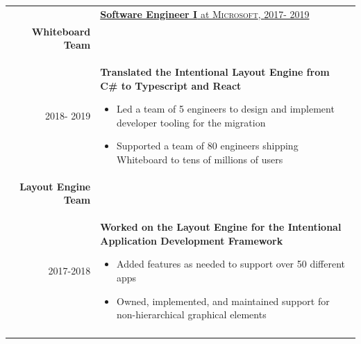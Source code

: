 \documentclass[letterpaper,10pt]{article} %
\newcommand{\work}[4]{\textsc{#1} & \underline{\textbf{#2} at \textsc{#3}}\\ 
\\
& #4\\
\multicolumn{2}{c}{} \\}
\newcommand{\workTwo}[9]{& \underline{\textbf{#2} at \textsc{#3},  \textsc{#1}}\\
\textbf{#4} \\
\textsc{#5} & #6\\
\textbf{#7} \\
\textsc{#8} & #9 \\
\multicolumn{2}{c}{} \\}
\begin{document}
\begin{tabular}{r|p{14.5cm}}
{%


}


\workTwo{2017- 2019}{Software Engineer I}{Microsoft}
{ Whiteboard Team }{2018- 2019}{

\textbf{Translated the Intentional Layout Engine from C\# to Typescript and React}
\begin{itemize}
	\item{Led a team of 5 engineers to design and implement developer tooling for the migration}
	\item{Supported a team of 80 engineers shipping Whiteboard to tens of millions of users}
\end{itemize} 

}
{ Layout Engine Team}{2017-2018}{
\textbf{Worked on the Layout Engine for the Intentional Application Development Framework}
\begin{itemize}
	\item{Added features as needed to support over 50 different apps}
	\item{Owned, implemented, and maintained support for non-hierarchical graphical elements}
\end{itemize}


}

\end{tabular}
\vspace{-7mm} %
\end{document}
